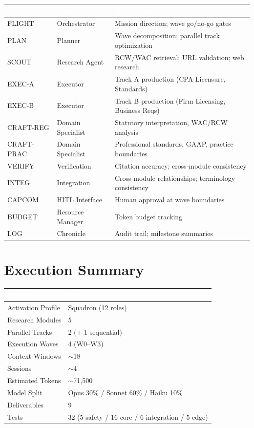 \documentclass[11pt,letterpaper]{article}
\newcommand{\tableheader}[1]{\textbf{\sffamily\textcolor{white}{#1}}}
\begin{document}
\begin{center}
\begin{tabularx}{\textwidth}{L{2.5cm}L{2.5cm}X}
\toprule
{}
\tableheader{Role} & \tableheader{Agent} & \tableheader{Responsibility} \\
\midrule
FLIGHT & Orchestrator & Mission direction; wave go/no-go gates \\
PLAN & Planner & Wave decomposition; parallel track optimization \\
SCOUT & Research Agent & RCW/WAC retrieval; URL validation; web research \\
EXEC-A & Executor & Track A production (CPA Licensure, Standards) \\
EXEC-B & Executor & Track B production (Firm Licensing, Business Reqs) \\
CRAFT-REG & Domain Specialist & Statutory interpretation, WAC/RCW analysis \\
CRAFT-PRAC & Domain Specialist & Professional standards, GAAP, practice boundaries \\
VERIFY & Verification & Citation accuracy; cross-module consistency \\
INTEG & Integration & Cross-module relationships; terminology consistency \\
CAPCOM & HITL Interface & Human approval at wave boundaries \\
BUDGET & Resource Manager & Token budget tracking \\
LOG & Chronicle & Audit trail; milestone summaries \\
\bottomrule
\end{tabularx}
\end{center}

\section{Execution Summary}

\begin{center}
\begin{tabularx}{\textwidth}{L{5cm}X}
\toprule
{}
\tableheader{Metric} & \tableheader{Value} \\
\midrule
Activation Profile & Squadron (12 roles) \\
Research Modules & 5 \\
Parallel Tracks & 2 (+ 1 sequential) \\
Execution Waves & 4 (W0--W3) \\
Context Windows & $\sim$18 \\
Sessions & $\sim$4 \\
Estimated Tokens & $\sim$71,500 \\
Model Split & Opus 30\% / Sonnet 60\% / Haiku 10\% \\
Deliverables & 9 \\
Tests & 32 (5 safety / 16 core / 6 integration / 5 edge) \\
\bottomrule
\end{tabularx}
\end{center}
\end{document}
